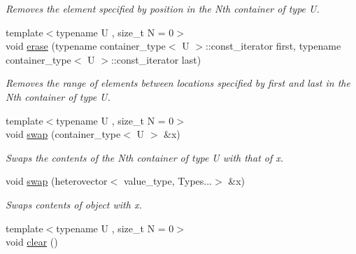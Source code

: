 \begin{DoxyCompactItemize}
\begin{DoxyCompactList}\small\item\em Removes the element specified by position in the Nth container of type U. \end{DoxyCompactList}\item 
\hypertarget{classheterogeneous_1_1heterovector_3_01_t_00_01_types_8_8_8_4_a1143b814f5e3207e2a4483c36eeb9a74}{}{\footnotesize template$<$typename U , size\+\_\+t N = 0$>$ }\\void \hyperlink{classheterogeneous_1_1heterovector_3_01_t_00_01_types_8_8_8_4_a1143b814f5e3207e2a4483c36eeb9a74}{erase} (typename container\+\_\+type$<$ U $>$\+::const\+\_\+iterator first, typename container\+\_\+type$<$ U $>$\+::const\+\_\+iterator last)\label{classheterogeneous_1_1heterovector_3_01_t_00_01_types_8_8_8_4_a1143b814f5e3207e2a4483c36eeb9a74}

\begin{DoxyCompactList}\small\item\em Removes the range of elements between locations specified by first and last in the Nth container of type U. \end{DoxyCompactList}\item 
\hypertarget{classheterogeneous_1_1heterovector_3_01_t_00_01_types_8_8_8_4_a3c74833fc5d69263f3ceb4d4769bac25}{}{\footnotesize template$<$typename U , size\+\_\+t N = 0$>$ }\\void \hyperlink{classheterogeneous_1_1heterovector_3_01_t_00_01_types_8_8_8_4_a3c74833fc5d69263f3ceb4d4769bac25}{swap} (container\+\_\+type$<$ U $>$ \&x)\label{classheterogeneous_1_1heterovector_3_01_t_00_01_types_8_8_8_4_a3c74833fc5d69263f3ceb4d4769bac25}

\begin{DoxyCompactList}\small\item\em Swaps the contents of the Nth container of type U with that of x. \end{DoxyCompactList}\item 
\hypertarget{classheterogeneous_1_1heterovector_3_01_t_00_01_types_8_8_8_4_aae585ab107d451798f91f3f65de13129}{}void \hyperlink{classheterogeneous_1_1heterovector_3_01_t_00_01_types_8_8_8_4_aae585ab107d451798f91f3f65de13129}{swap} (heterovector$<$ value\+\_\+type, Types...$>$ \&x)\label{classheterogeneous_1_1heterovector_3_01_t_00_01_types_8_8_8_4_aae585ab107d451798f91f3f65de13129}

\begin{DoxyCompactList}\small\item\em Swaps contents of object with x. \end{DoxyCompactList}\item 
\hypertarget{classheterogeneous_1_1heterovector_3_01_t_00_01_types_8_8_8_4_ae92822698ced240d0a4fd6f320668818}{}{\footnotesize template$<$typename U , size\+\_\+t N = 0$>$ }\\void \hyperlink{classheterogeneous_1_1heterovector_3_01_t_00_01_types_8_8_8_4_ae92822698ced240d0a4fd6f320668818}{clear} ()\label{classheterogeneous_1_1heterovector_3_01_t_00_01_types_8_8_8_4_ae92822698ced240d0a4fd6f320668818}


\end{DoxyCompactItemize}
